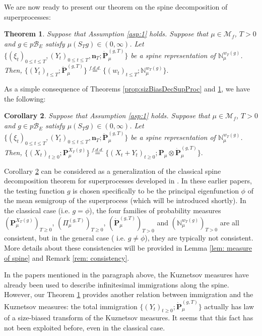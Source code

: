 \documentclass[UTF8]{pkuthss}
\theoremstyle{plain}
\newtheorem{thm}{Theorem}[section]
\newtheorem{cor}[thm]{Corollary}
\theoremstyle{definition}
\numberwithin{equation}{section}
\begin{document}
	We are now ready to present our theorem on the spine decomposition of superprocesses:
\begin{thm}\label{prop:sizBiasNMeas}
	Suppose that Assumption \ref{asp:1} holds.
	Suppose that $\mu \in \mathcal M_f$, $T >0$ and $g \in p\mathscr B_E$ satisfy $\mu(S_Tg)\in (0,\infty)$.
	Let $\{(\xi_t)_{0\leq t\leq T}, (Y_t)_{0\leq t\leq T}, \mathbf n_T; \dot {\mathbf P}^{(g,T)}_\mu\}$ be a spine representation of $\mathbb N_\mu^{w_T(g)}$.
	Then,
$
	\{(Y_t)_{t\leq T}; \dot{\mathbf P}^{(g,T)}_\mu\}
	\overset{f.d.d.}{=} \{(w_t)_{t\leq T}; \mathbb N_\mu^{w_T(g)}\}.
$
\end{thm}
	As a simple consequence of Theorems \ref{prop:sizBiasDecSupProc} and  \ref{prop:sizBiasNMeas}, we have the following:
\begin{cor}\label{cro: spine decomposition}
	Suppose that Assumption \ref{asp:1} holds.
	Suppose that $\mu \in \mathcal M_f$, $T >0$ and $g \in p\mathscr B_E$ satisfy $\mu(S_Tg)\in (0,\infty)$.
	Let $\{(\xi_t)_{0\leq t\leq T}, (Y_t)_{0\leq t\leq T}, \mathbf n_T; \dot {\mathbf P}^{(g,T)}_\mu\}$ be a spine representation of $\mathbb N_\mu^{w_T(g)}$.
	Then,
$
	\{(X_t)_{t\geq 0}; \mathbf P_\mu^{X_T(g)}\}
	\overset{f.d.d.}{=} \{(X_t + Y_t)_{t\geq 0}; \mathbf P_\mu \otimes \dot {\mathbf P}^{(g,T)}_\mu\}.
$
\end{cor}
	
	Corollary \ref{cro: spine decomposition} can be considered as a generalization of the classical spine decomposition theorem for superprocesses developed in \cite{EckhoffKyprianouWinkel2015Spines, EnglanderKyprianou2004Local, LiuRenSong2009Log}.
		In these earlier papers, the testing function $g$ is chosen specifically to be  the principal eigenfunction $\phi$ of the mean semigroup of the superprocess (which will be introduced shortly).
In the classical case (i.e. $g = \phi$), the four families of probability measures
	$(\mathbf P_\mu^{X_T(g)})_{T\geq 0}$, $(\Pi_\mu^{(g, T)})_{T\geq 0}$, $(\dot{\mathbf P}_{\mu}^{(g,T)})_{T>0}$
		and $(\mathbb N_\mu^{w_T(g)})_{T> 0}$ are all consistent,
	but  in the general case ( i.e. $g\neq \phi$), they are typically not consistent.
	More details about these consistencies will be provided in Lemma \ref{lem: measure of spine} and Remark \ref{rem: consistency}.
	
In the papers mentioned in the paragraph above, the Kuznetsov measures have already been used to describe infinitesimal immigrations along the spine.
	However, our Theorem \ref{prop:sizBiasNMeas} provides
   another  relation between
	immigration and the Kuznetsov measures: the total immigration $\{(Y_t)_{t\geq 0}; \dot {\mathbf P}^{(g,T)}_\mu\}$ actually has law of a size-biased transform of the Kuznetsov measures.
It seems that this fact has not been exploited before, even in the classical case.
\end{document}
